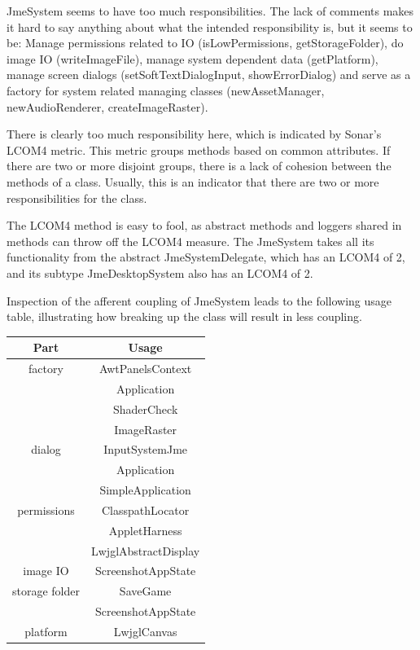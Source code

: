 \documentclass[a4paper, 10pt]{article}
\begin{document}
JmeSystem seems to have too much responsibilities.
The lack of comments makes it hard to say anything about what 
the intended responsibility is, but it seems to be:
Manage permissions related to IO 
(isLowPermissions, getStorageFolder),
do image IO (writeImageFile),
manage system dependent data (getPlatform),
manage screen dialogs 
(setSoftTextDialogInput, showErrorDialog) and
serve as a factory for system related managing classes 
(newAssetManager, newAudioRenderer, createImageRaster).

There is clearly too much responsibility here, 
which is indicated by Sonar's LCOM4 metric.
This metric groups methods based on common attributes.
If there are two or more disjoint groups, 
there is a lack of cohesion between the methods of a class.
Usually, this is an indicator that there are two or more 
responsibilities for the class.

The LCOM4 method is easy to fool, as
abstract methods and loggers shared in methods can throw off
the LCOM4 measure.
The JmeSystem takes all its functionality 
from the abstract JmeSystemDelegate, 
which has an LCOM4 of 2,
and its subtype JmeDesktopSystem also has an LCOM4 of 2.

Inspection of the afferent coupling of JmeSystem 
leads to the following usage table, 
illustrating how breaking up the class will result in 
less coupling.

\begin{tabular}{|c|c|}
\hline
\textbf{Part}&\textbf{Usage}\\\hline
factory	& AwtPanelsContext\\\hline
		& Application\\\hline
		& ShaderCheck\\\hline
		& ImageRaster\\\hline
dialog	& InputSystemJme\\\hline
		& Application\\\hline
		& SimpleApplication\\\hline
permissions	& ClasspathLocator\\\hline
		& AppletHarness\\\hline
		& LwjglAbstractDisplay\\\hline
image IO	& ScreenshotAppState\\\hline
storage folder	& SaveGame\\\hline
		& ScreenshotAppState\\\hline
platform	& LwjglCanvas\\\hline
\end{tabular}
\end{document}

